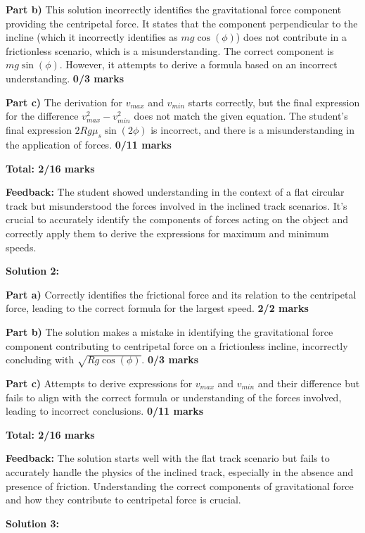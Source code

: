 \documentclass[a4paper,11pt]{article}
\begin{document}
\textbf{Part b)} This solution incorrectly identifies the gravitational force component providing the centripetal force. It states that the component perpendicular to the incline (which it incorrectly identifies as \( mg\cos(\phi) \)) does not contribute in a frictionless scenario, which is a misunderstanding. The correct component is \( mg\sin(\phi) \). However, it attempts to derive a formula based on an incorrect understanding. \textbf{0/3 marks}

\textbf{Part c)} The derivation for \( v_{max} \) and \( v_{min} \) starts correctly, but the final expression for the difference \( v_{max}^2 - v_{min}^2 \) does not match the given equation. The student's final expression \( 2Rg\mu_s\sin(2\phi) \) is incorrect, and there is a misunderstanding in the application of forces. \textbf{0/11 marks}

\textbf{Total: 2/16 marks}

\textbf{Feedback:} The student showed understanding in the context of a flat circular track but misunderstood the forces involved in the inclined track scenarios. It's crucial to accurately identify the components of forces acting on the object and correctly apply them to derive the expressions for maximum and minimum speeds.

\textbf{Solution 2:}

\textbf{Part a)} Correctly identifies the frictional force and its relation to the centripetal force, leading to the correct formula for the largest speed. \textbf{2/2 marks}

\textbf{Part b)} The solution makes a mistake in identifying the gravitational force component contributing to centripetal force on a frictionless incline, incorrectly concluding with \( \sqrt{Rg\cos(\phi)} \). \textbf{0/3 marks}

\textbf{Part c)} Attempts to derive expressions for \( v_{max} \) and \( v_{min} \) and their difference but fails to align with the correct formula or understanding of the forces involved, leading to incorrect conclusions. \textbf{0/11 marks}

\textbf{Total: 2/16 marks}

\textbf{Feedback:} The solution starts well with the flat track scenario but fails to accurately handle the physics of the inclined track, especially in the absence and presence of friction. Understanding the correct components of gravitational force and how they contribute to centripetal force is crucial.

\textbf{Solution 3:}
\end{document}
